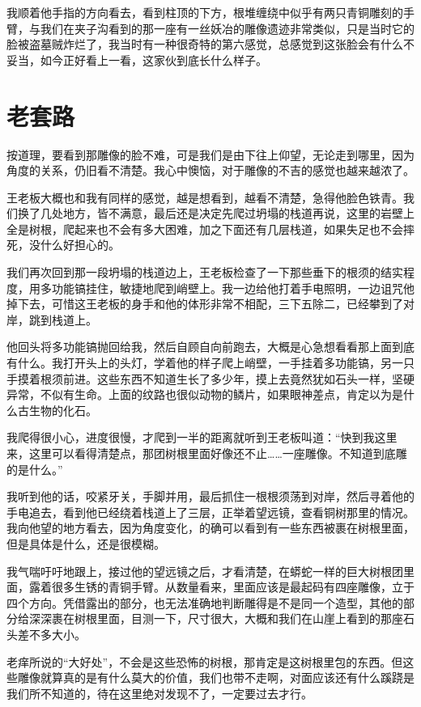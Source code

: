 我顺着他手指的方向看去，看到柱顶的下方，根堆缠绕中似乎有两只青铜雕刻的手臂，与我们在夹子沟看到的那一座有一丝妖冶的雕像遗迹非常类似，只是当时它的脸被盗墓贼炸烂了，我当时有一种很奇特的第六感觉，总感觉到这张脸会有什么不妥当，如今正好看上一看，这家伙到底长什么样子。

\chapter{老套路}

按道理，要看到那雕像的脸不难，可是我们是由下往上仰望，无论走到哪里，因为角度的关系，仍旧看不清楚。我心中懊恼，对于雕像的不吉的感觉也越来越浓了。

王老板大概也和我有同样的感觉，越是想看到，越看不清楚，急得他脸色铁青。我们换了几处地方，皆不满意，最后还是决定先爬过坍塌的栈道再说，这里的岩壁上全是树根，爬起来也不会有多大困难，加之下面还有几层栈道，如果失足也不会摔死，没什么好担心的。

我们再次回到那一段坍塌的栈道边上，王老板检查了一下那些垂下的根须的结实程度，用多功能镐挂住，敏捷地爬到峭壁上。我一边给他打着手电照明，一边诅咒他掉下去，可惜这王老板的身手和他的体形非常不相配，三下五除二，已经攀到了对岸，跳到栈道上。

他回头将多功能镐抛回给我，然后自顾自向前跑去，大概是心急想看看那上面到底有什么。我打开头上的头灯，学着他的样子爬上峭壁，一手挂着多功能镐，另一只手摸着根须前进。这些东西不知道生长了多少年，摸上去竟然犹如石头一样，坚硬异常，不似有生命。上面的纹路也很似动物的鳞片，如果眼神差点，肯定以为是什么古生物的化石。

我爬得很小心，进度很慢，才爬到一半的距离就听到王老板叫道：“快到我这里来，这里可以看得清楚点，那团树根里面好像还不止……一座雕像。不知道到底雕的是什么。”

我听到他的话，咬紧牙关，手脚并用，最后抓住一根根须荡到对岸，然后寻着他的手电追去，看到他已经绕着栈道上了三层，正举着望远镜，查看铜树那里的情况。我向他望的地方看去，因为角度变化，的确可以看到有一些东西被裹在树根里面，但是具体是什么，还是很模糊。

我气喘吁吁地跟上，接过他的望远镜之后，才看清楚，在蟒蛇一样的巨大树根团里面，露着很多生锈的青铜手臂。从数量看来，里面应该是最起码有四座雕像，立于四个方向。凭借露出的部分，也无法准确地判断雕得是不是同一个造型，其他的部分给深深裹在树根里面，目测一下，尺寸很大，大概和我们在山崖上看到的那座石头差不多大小。

老痒所说的“大好处”，不会是这些恐怖的树根，那肯定是这树根里包的东西。但这些雕像就算真的是有什么莫大的价值，我们也带不走啊，对面应该还有什么蹊跷是我们所不知道的，待在这里绝对发现不了，一定要过去才行。

